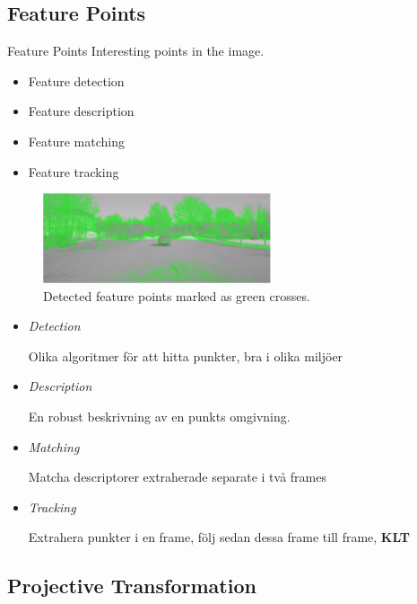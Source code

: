 \documentclass{beamer}
\renewcommand{\a}{\r{a}\xspace}
\renewcommand{\o}{\"o\xspace}
\begin{document}
\subsection{Feature Points}

\begin{frame}{Feature Points}
	Interesting points in the image.
	\begin{itemize}
		\item Feature detection
		\item Feature description
		\item Feature matching
		\item Feature tracking
	\end{itemize}
	\vfill
	\begin{figure}
		\centering
		\includegraphics[width=0.6\textwidth]{harris_features}
		\caption{\label{fig:featurepointexample} Detected feature points marked as green crosses.}
	\end{figure}

	\note
	{
		\begin{itemize}
			\item \textit{Detection}

			Olika algoritmer f\o{}r att hitta punkter, bra i olika milj\o{}er

			\item \textit{Description}

			En robust beskrivning av en punkts omgivning.

			\item \textit{Matching}

			Matcha descriptorer extraherade separate i tv\a frames

			\item \textit{Tracking}

			Extrahera punkter i en frame, f\o{}lj sedan dessa frame till frame, \textbf{KLT}
		\end{itemize}
	}
\end{frame}

\subsection{Projective Transformation}
\end{document}
